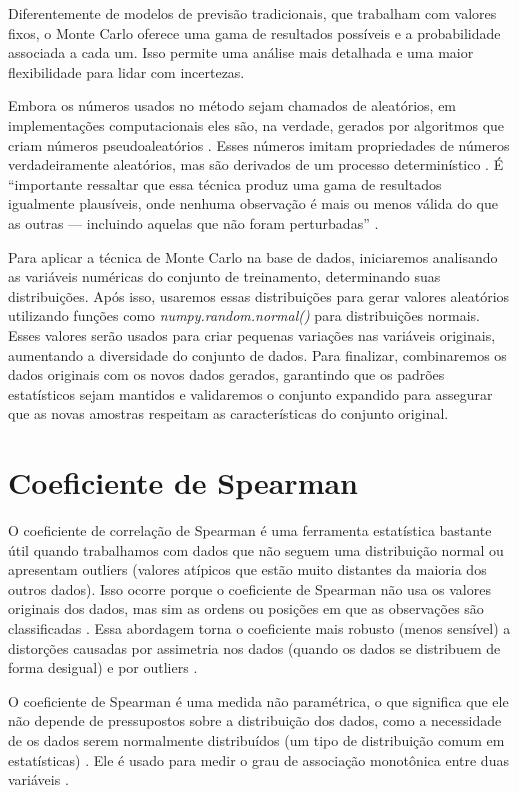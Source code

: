 \begin{apendicesenv}
Diferentemente de modelos de previsão tradicionais, que trabalham com valores fixos, o Monte Carlo oferece uma gama de resultados possíveis e a probabilidade associada a cada um. Isso permite uma análise mais detalhada e uma maior flexibilidade para lidar com incertezas.

Embora os números usados no método sejam chamados de aleatórios, em implementações computacionais eles são, na verdade, gerados por algoritmos que criam números pseudoaleatórios \cite{kalos2009}. Esses números imitam propriedades de números verdadeiramente aleatórios, mas são derivados de um processo determinístico \cite{kalos2009}. É “importante ressaltar que essa técnica produz uma gama de resultados igualmente plausíveis, onde nenhuma observação é mais ou menos válida do que as outras --- incluindo aquelas que não foram perturbadas” \cite{kiar2021}.

Para aplicar a técnica de Monte Carlo na base de dados, iniciaremos analisando as variáveis numéricas do conjunto de treinamento, determinando suas distribuições. Após isso, usaremos essas distribuições para gerar valores aleatórios utilizando funções como \textit{numpy.random.normal()} para distribuições normais. Esses valores serão usados para criar pequenas variações nas variáveis originais, aumentando a diversidade do conjunto de dados. Para finalizar, combinaremos os dados originais com os novos dados gerados, garantindo que os padrões estatísticos sejam mantidos e validaremos o conjunto expandido para assegurar que as novas amostras respeitam as características do conjunto original.

\chapter{Coeficiente de Spearman}
\label{apendice:spearman}


O coeficiente de correlação de Spearman é uma ferramenta estatística bastante útil quando trabalhamos com dados que não seguem uma distribuição normal ou apresentam outliers (valores atípicos que estão muito distantes da maioria dos outros dados). Isso ocorre porque o coeficiente de Spearman não usa os valores originais dos dados, mas sim as ordens ou posições em que as observações são classificadas \cite{sousa2019}. Essa abordagem torna o coeficiente mais robusto (menos sensível) a distorções causadas por assimetria nos dados (quando os dados se distribuem de forma desigual) e por outliers \cite{sousa2019}.

O coeficiente de Spearman é uma medida não paramétrica, o que significa que ele não depende de pressupostos sobre a distribuição dos dados, como a necessidade de os dados serem normalmente distribuídos (um tipo de distribuição comum em estatísticas) \cite{restrepo2007}. Ele é usado para medir o grau de associação monotônica entre duas variáveis \cite{restrepo2007}.


\end{apendicesenv}
